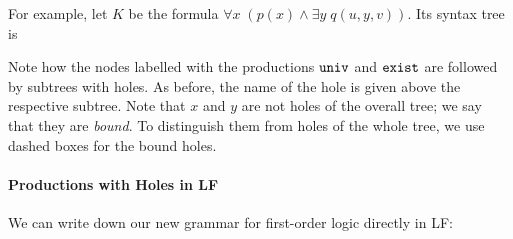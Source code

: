 For example, let $K$ be the formula $\forall x\;(p(x) \wedge \exists y\;q(u,y,v))$. Its syntax tree is

\begin{center}
\end{center}

Note how the nodes labelled with the productions $\mathtt{univ}$ and $\mathtt{exist}$ are followed by subtrees with holes. As before, the name of the hole is given above the respective subtree. Note that $x$ and $y$ are not holes of the overall tree; we say that they are \emph{bound}. To distinguish them from holes of the whole tree, we use dashed boxes for the bound holes.


\paragraph{Productions with Holes in LF}
We can write down our new grammar for first-order logic directly in LF:

